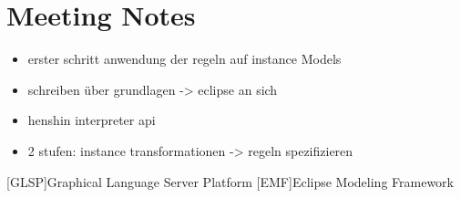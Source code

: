 \documentclass[conference,onecolumn]{IEEEtran}
\begin{document}
  \section{Meeting Notes}

  \begin{itemize}
    \item erster schritt anwendung der regeln auf instance Models
    \item schreiben über grundlagen -> eclipse an sich
    \item henshin interpreter api
    \item 2 stufen: instance transformationen -> regeln spezifizieren
  \end{itemize}


  \printbibliography

  \begin{acronym}
    [GLSP]{Graphical Language Server Platform}
    [EMF]{Eclipse Modeling Framework}

  \end{acronym}
\end{document}
